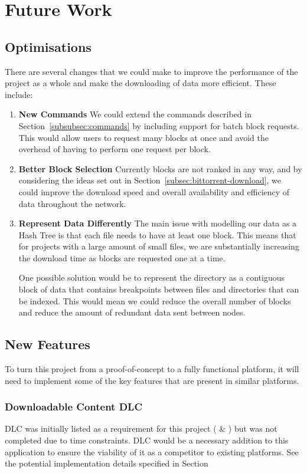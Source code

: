 \section{Future Work}

\subsection{Optimisations}

There are several changes that we could make to improve the performance of the project as a whole and make the downloading of data more efficient. These include:

\begin{enumerate}
  \item \textbf{New Commands} We could extend the commands described in Section~\ref{subsubsec:commands} by including support for batch block requests. This would allow users to request many blocks at once and avoid the overhead of having to perform one request per block.  
  \item \textbf{Better Block Selection} Currently blocks are not ranked in any way, and by considering the ideas set out in Section~\ref{subsec:bittorrent-download}, we could improve the download speed and overall availability and efficiency of data throughout the network.
  \item \textbf{Represent Data Differently} The main issue with modelling our data as a Hash Tree is that each file needs to have at least one block. This means that for projects with a large amount of small files, we are substantially increasing the download time as blocks are requested one at a time.

  One possible solution would be to represent the directory as a contiguous block of data that contains breakpoints between files and directories that can be indexed. This would mean we could reduce the overall number of blocks and reduce the amount of redundant data sent between nodes.
\end{enumerate}

\subsection{New Features}

To turn this project from a proof-of-concept to a fully functional platform, it will need to implement some of the key features that are present in similar platforms.

\subsubsection{Downloadable Content DLC}
DLC was initially listed as a requirement for this project ( \& ) but was not completed due to time constraints. DLC would be a necessary addition to this application to ensure the viability of it as a competitor to existing platforms. See the potential implementation details specified in Section

